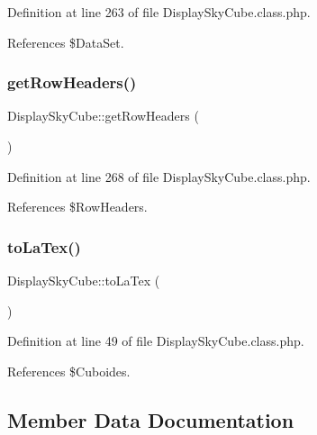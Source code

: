 Definition at line 263 of file Display\+Sky\+Cube.\+class.\+php.



References \$\+Data\+Set.

\mbox{\label{class_display_sky_cube_ac9cbad0b516e9e4c105f8499ae00db7a}} 
\subsubsection{\texorpdfstring{get\+Row\+Headers()}{getRowHeaders()}}
{\footnotesize\ttfamily Display\+Sky\+Cube\+::get\+Row\+Headers (\begin{DoxyParamCaption}{ }\end{DoxyParamCaption})}



Definition at line 268 of file Display\+Sky\+Cube.\+class.\+php.



References \$\+Row\+Headers.

\mbox{\label{class_display_sky_cube_a00fd4692d451b7822e09609cb55c35a5}} 
\subsubsection{\texorpdfstring{to\+La\+Tex()}{toLaTex()}}
{\footnotesize\ttfamily Display\+Sky\+Cube\+::to\+La\+Tex (\begin{DoxyParamCaption}{ }\end{DoxyParamCaption})}



Definition at line 49 of file Display\+Sky\+Cube.\+class.\+php.



References \$\+Cuboides.



\subsection{Member Data Documentation}
\mbox{\label{class_display_sky_cube_af896f9ca7972c3bfbd771fe17e2bfa8d}} 

